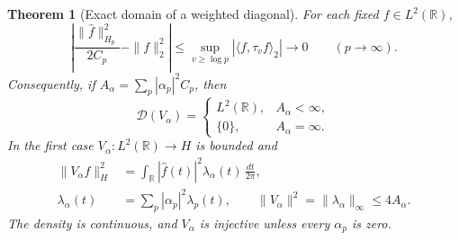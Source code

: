 \documentclass[11pt]{article}
\newtheorem{theorem}{Theorem}[section]
\theoremstyle{definition}
\theoremstyle{remark}
\numberwithin{equation}{section}
\newcommand{\R}{\mathbb R}
\begin{document}
\begin{theorem}[Exact domain of a weighted diagonal]
\label{thm:wc-weighted-domain}
For each fixed $f\in L^2(\R)$,
\begin{equation}
 \left|\frac{\|\widehat f\|_{H_p}^2}{2C_p}-\|f\|_2^2\right|
 \leq\sup_{v\geq\log p}|\langle f,\tau_vf\rangle_2|
 \longrightarrow0\qquad(p\to\infty).
 \label{eq:wc-local-asymptotic}
\end{equation}
Consequently, if
$A_\alpha=\sum_p|\alpha_p|^2C_p$, then
\begin{equation}
 \mathcal D(V_\alpha)=
 \begin{cases}
 L^2(\R),& A_\alpha<\infty,\\
 \{0\},& A_\alpha=\infty.
 \end{cases}
 \label{eq:wc-domain-dichotomy}
\end{equation}
In the first case $V_\alpha:L^2(\R)\to H$ is bounded and
\begin{equation}
 \begin{aligned}
 \|V_\alpha f\|_H^2
 &=\int_\R|\widehat f(t)|^2\lambda_\alpha(t)\,\frac{dt}{2\pi},\\
 \lambda_\alpha(t)&=\sum_p|\alpha_p|^2\lambda_p(t),\qquad
 \|V_\alpha\|^2=\|\lambda_\alpha\|_\infty\leq4A_\alpha.
 \end{aligned}
 \label{eq:wc-weighted-norm}
\end{equation}
The density is continuous, and $V_\alpha$ is injective unless every
$\alpha_p$ is zero.
\end{theorem}
\end{document}
